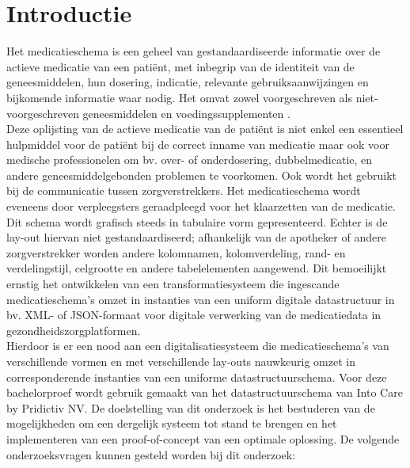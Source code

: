 
\section{Introductie} %
\label{sec:introductie}

Het medicatieschema is een geheel van gestandaardiseerde informatie over de actieve medicatie van een patiënt, met inbegrip van de identiteit van de geneesmiddelen, hun dosering, indicatie, relevante gebruiksaanwijzingen en bijkomende informatie waar nodig. Het omvat zowel voorgeschreven als niet-voorgeschreven geneesmiddelen en voedingssupplementen \autocite{ApothekersNetwerk2013}.\\ 

\noindent Deze oplijsting van de actieve medicatie van de patiënt is niet enkel een essentieel hulpmiddel voor de patiënt bij de correct inname van medicatie maar ook voor medische professionelen om bv. over- of onderdosering, dubbelmedicatie, en andere geneesmiddelgebonden problemen te voorkomen. Ook wordt het gebruikt bij de communicatie tussen zorgverstrekkers. Het medicatieschema wordt eveneens door verpleegsters geraadpleegd voor het klaarzetten van de medicatie.\\

\noindent Dit schema wordt grafisch steeds in tabulaire vorm gepresenteerd. Echter is de lay-out hiervan niet gestandaardiseerd; afhankelijk van de apotheker of andere zorgverstrekker worden andere kolomnamen, kolomverdeling, rand- en verdelingstijl, celgrootte en andere tabelelementen aangewend. Dit bemoeilijkt ernstig het ontwikkelen van een transformatiesysteem die ingescande medicatieschema's omzet in instanties van een uniform digitale datastructuur in bv. XML- of JSON-formaat voor digitale verwerking van de medicatiedata in gezondheidszorgplatformen.\\

\noindent Hierdoor is er een nood aan een digitalisatiesysteem die medicatieschema's van verschillende vormen en met verschillende lay-outs nauwkeurig omzet in corresponderende instanties van een uniforme datastructuurschema. Voor deze bachelorproef wordt gebruik gemaakt van het datastructuurschema van Into Care by Pridictiv NV. De doelstelling van dit onderzoek is het bestuderen van de mogelijkheden om een dergelijk systeem tot stand te brengen en het implementeren van een proof-of-concept van een optimale oplossing. De volgende onderzoeksvragen kunnen gesteld worden bij dit onderzoek:\\ 

